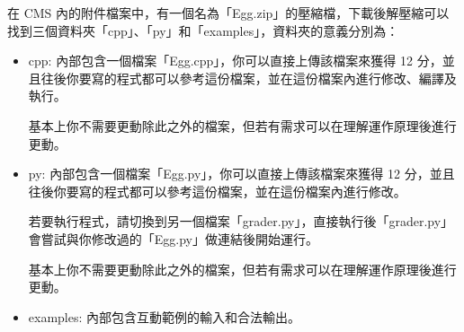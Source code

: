 在 CMS 內的附件檔案中，有一個名為「Egg.zip」的壓縮檔，下載後解壓縮可以找到三個資料夾「cpp」、「py」和「examples」，資料夾的意義分別為：
\begin{itemize}
    \item cpp: 內部包含一個檔案「Egg.cpp」，你可以直接上傳該檔案來獲得 12 分，並且往後你要寫的程式都可以參考這份檔案，並在這份檔案內進行修改、編譯及執行。


基本上你不需要更動除此之外的檔案，但若有需求可以在理解運作原理後進行更動。

    \item py: 內部包含一個檔案「Egg.py」，你可以直接上傳該檔案來獲得 12 分，並且往後你要寫的程式都可以參考這份檔案，並在這份檔案內進行修改。

若要執行程式，請切換到另一個檔案「grader.py」，直接執行後「grader.py」會嘗試與你修改過的「Egg.py」做連結後開始運行。

基本上你不需要更動除此之外的檔案，但若有需求可以在理解運作原理後進行更動。

    \item examples: 內部包含互動範例的輸入和合法輸出。
\end{itemize}



